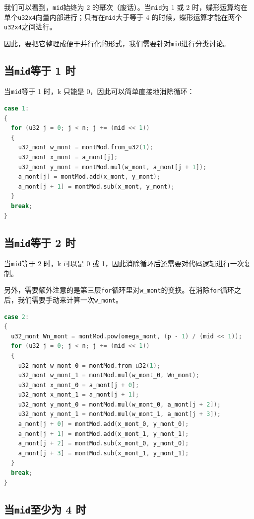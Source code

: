 \documentclass[a4paper]{article}
\begin{document}
我们可以看到，\texttt{mid}始终为 2 的幂次（废话）。当\texttt{mid}为 1 或 2 时，蝶形运算均在单个\texttt{u32x4}向量内部进行；只有在\texttt{mid}大于等于 4 的时候，蝶形运算才能在两个\texttt{u32x4}之间进行。

因此，要把它整理成便于并行化的形式，我们需要针对\texttt{mid}进行分类讨论。

\subsection{当\texttt{mid}等于 1 时}

当\texttt{mid}等于 1 时，k 只能是 0，因此可以简单直接地消除循环：

\begin{lstlisting}[language=C++]
case 1:
{
  for (u32 j = 0; j < n; j += (mid << 1))
  {
    u32_mont w_mont = montMod.from_u32(1);
    u32_mont x_mont = a_mont[j];
    u32_mont y_mont = montMod.mul(w_mont, a_mont[j + 1]);
    a_mont[j] = montMod.add(x_mont, y_mont);
    a_mont[j + 1] = montMod.sub(x_mont, y_mont);
  }
  break;
}
\end{lstlisting}

\subsection{当\texttt{mid}等于 2 时}

当\texttt{mid}等于 2 时，k 可以是 0 或 1，因此消除循环后还需要对代码逻辑进行一次复制。

另外，需要额外注意的是第三层\texttt{for}循环里对\texttt{w\_mont}的变换。在消除\texttt{for}循环之后，我们需要手动来计算一次\texttt{w\_mont}。

\begin{lstlisting}[language=C++]
case 2:
{
  u32_mont Wn_mont = montMod.pow(omega_mont, (p - 1) / (mid << 1));
  for (u32 j = 0; j < n; j += (mid << 1))
  {
    u32_mont w_mont_0 = montMod.from_u32(1);
    u32_mont w_mont_1 = montMod.mul(w_mont_0, Wn_mont);
    u32_mont x_mont_0 = a_mont[j + 0];
    u32_mont x_mont_1 = a_mont[j + 1];
    u32_mont y_mont_0 = montMod.mul(w_mont_0, a_mont[j + 2]);
    u32_mont y_mont_1 = montMod.mul(w_mont_1, a_mont[j + 3]);
    a_mont[j + 0] = montMod.add(x_mont_0, y_mont_0);
    a_mont[j + 1] = montMod.add(x_mont_1, y_mont_1);
    a_mont[j + 2] = montMod.sub(x_mont_0, y_mont_0);
    a_mont[j + 3] = montMod.sub(x_mont_1, y_mont_1);
  }
  break;
}
\end{lstlisting}

\subsection{当\texttt{mid}至少为 4 时}
\end{document}

